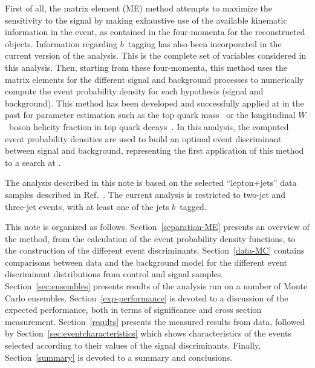 First of all, the matrix element (ME) method attempts to maximize the
sensitivity to the signal by making exhaustive use of the available
kinematic information in the event, as contained in the four-momenta
for the reconstructed objects. Information regarding $b$~tagging has
also been incorporated in the current version of the analysis. This is
the complete set of variables considered in this analysis. Then,
starting from these four-momenta, this method uses the matrix elements
for the different signal and background processes to numerically
compute the event probability density for each hypothesis (signal and
background). This method has been developed and successfully applied
at {\dzero} in the past for parameter estimation such as the top quark
mass~\cite{Abazov:2004cs,Abazov:2006bd} or the longitudinal $W$~boson
helicity fraction in top quark decays~\cite{Abazov:2004ym}. In this
analysis, the computed event probability densities are used to build
an optimal event discriminant between signal and background,
representing the first application of this method to a search at
{\dzero}.

The analysis described in this note is based on the selected
``lepton+jets'' data samples described in Ref.~\cite{general-note}.
The current analysis is restricted to two-jet and three-jet events,
with at least one of the jets $b$~tagged.

This note is organized as follows. Section~\ref{separation-ME}
presents an overview of the method, from the calculation of the event
probability density functions, to the construction of the different
event discriminants. Section~\ref{data-MC} contains comparisons
between data and the background model for the different event
discriminant distributions from control and signal samples.
Section~\ref{sec:ensembles} presents results of the analysis run on a
number of Monte Carlo ensembles. Section~\ref{exp-performance} is
devoted to a discussion of the expected performance, both in terms of
significance and cross section measurement. Section~\ref{results}
presents the measured results from data, followed by
Section~\ref{sec:eventcharacteristics} which shows characteristics of
the events selected according to their values of the signal
discriminants. Finally, Section~\ref{summary} is devoted to a summary
and conclusions.


